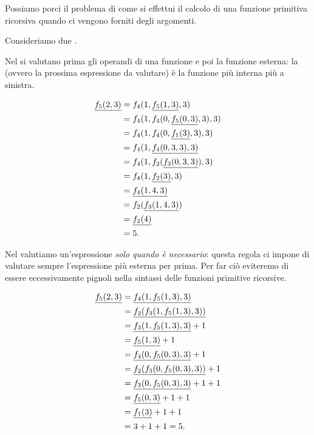 Possiamo porci il problema di come si effettui il calcolo di una funzione primitiva ricorsiva quando ci vengono forniti degli argomenti.

Consideriamo due .

 Nel  si valutano prima gli operandi di una funzione e poi la funzione esterna: la  (ovvero la prossima espressione da valutare) è la funzione più interna più a sinistra.

\begin{align*}
    \underline{f_5(2, 3)} 
        &= f_4(1, \underline{f_5(1, 3)}, 3) \\
        &= f_4(1, f_4(0, \underline{f_5(0, 3)}, 3), 3)\\
        &= f_4(1, f_4(0, \underline{f_1(3)}, 3), 3)\\
        &= f_4(1, \underline{f_4(0, 3, 3), 3)}\\
        &= f_4(1, f_2(\underline{f_3(0, 3, 3)}), 3)\\
        &= f_4(1, \underline{f_2(3)}, 3)\\
        &= \underline{f_4(1, 4, 3)}\\
        &= f_2(\underline{f_3(1, 4, 3)})\\
        &= \underline{f_2(4)}\\
        &= 5.
\end{align*}

 Nel  valutiamo un'espressione \emph{solo quando è necessario}: questa regola ci impone di valutare sempre l'espressione più esterna per prima. Per far ciò eviteremo di essere eccessivamente pignoli nella sintassi delle funzioni primitive ricorsive.

\begin{align*}
    \underline{f_5(2, 3)} 
        &= \underline{f_4(1, f_5(1, 3), 3)}\\
        &= \underline{f_2(f_3(1, f_5(1, 3), 3))}\\
        &= \underline{f_3(1, f_5(1, 3), 3)} + 1\\
        &= \underline{f_5(1, 3)} + 1\\
        &= \underline{f_4(0, f_5(0, 3), 3)} + 1\\
        &= \underline{f_2(f_3(0, f_5(0, 3), 3))} + 1\\
        &= \underline{f_3(0, f_5(0, 3), 3)} + 1 + 1\\
        &= \underline{f_5(0, 3)} + 1 + 1\\
        &= \underline{f_1(3)} + 1 + 1\\
        &= 3 + 1 + 1 = 5.
\end{align*}

